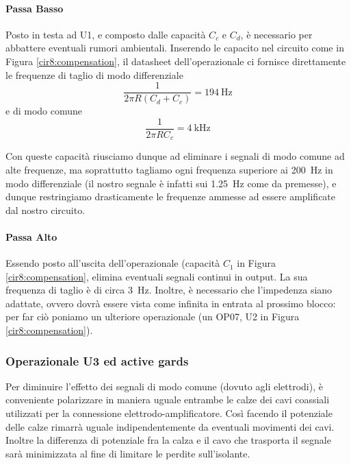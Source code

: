 \paragraph*{Passa Basso}
Posto in testa ad U1, e composto dalle capacità $C_c$ e $C_d$, è necessario per abbattere eventuali rumori ambientali. Inserendo le capacito nel circuito come in Figura \ref{cir8:compensation}, il datasheet dell'operazionale ci fornisce direttamente le frequenze di taglio di modo differenziale
\begin{equation*}
	\frac{1}{2 \pi R ( C_d + C_c ) } = \SI{194}{\Hz}
\end{equation*}
e di modo comune
\begin{equation*}
	\frac{1}{2 \pi R C_c} = \SI{4}{\kHz}
\end{equation*}

Con queste capacità riusciamo dunque ad eliminare i segnali di modo comune ad alte frequenze, ma soprattutto tagliamo ogni frequenza superiore ai \SI{200}{\Hz} in modo differenziale (il nostro segnale è infatti sui \SI{1.25}{\Hz} come da premesse), e dunque restringiamo drasticamente le frequenze ammesse ad essere amplificate dal nostro circuito.

\paragraph*{Passa Alto}
Essendo posto all'uscita dell'operazionale (capacità $C_1$ in Figura \ref{cir8:compensation}, elimina eventuali segnali continui in output. La sua frequenza di taglio è di circa \SI{3}{\Hz}. Inoltre, è necessario che l'impedenza siano adattate, ovvero dovrà essere vista come infinita in entrata al prossimo blocco: per far ciò poniamo un ulteriore operazionale (un OP07, U2 in Figura \ref{cir8:compensation}).

\subsubsection*{Operazionale U3 ed active gards}

Per diminuire l'effetto dei segnali di modo comune (dovuto agli elettrodi), è conveniente polarizzare in maniera uguale entrambe le calze dei cavi coassiali utilizzati per la connessione elettrodo-amplificatore. Così facendo il potenziale delle calze rimarrà uguale indipendentemente da eventuali movimenti dei cavi. Inoltre la differenza di potenziale fra la calza e il cavo che trasporta il segnale sarà minimizzata al fine di limitare le perdite sull'isolante.

